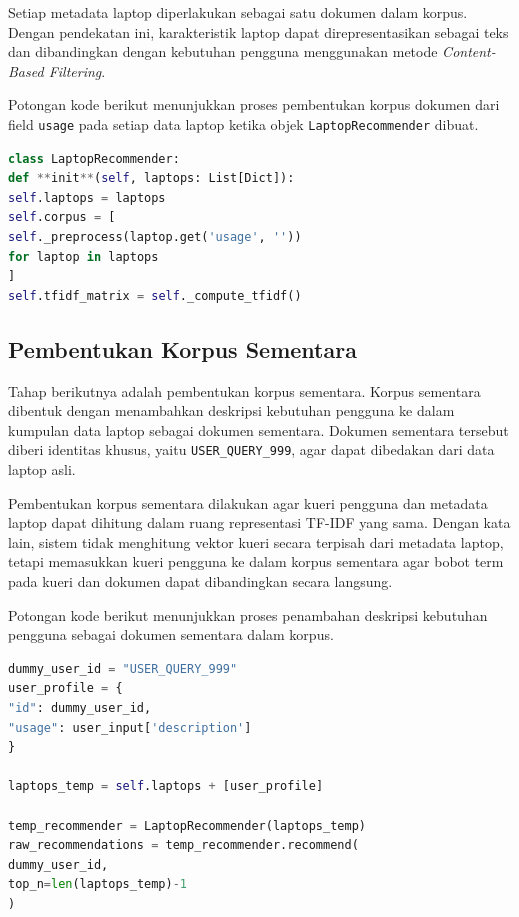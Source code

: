 Setiap metadata laptop diperlakukan sebagai satu dokumen dalam korpus. Dengan pendekatan ini, karakteristik laptop dapat direpresentasikan sebagai teks dan dibandingkan dengan kebutuhan pengguna menggunakan metode \textit{Content-Based Filtering}.

Potongan kode berikut menunjukkan proses pembentukan korpus dokumen dari field \texttt{usage} pada setiap data laptop ketika objek \texttt{LaptopRecommender} dibuat.

\begin{lstlisting}[basicstyle=\linespread{0.8}\ttfamily\footnotesize, language=Python, breaklines=true, caption={Potongan Kode Memuat Metadata Laptop sebagai Korpus}, label=kode:memuat_metadata_laptop]
class LaptopRecommender:
def **init**(self, laptops: List[Dict]):
self.laptops = laptops
self.corpus = [
self._preprocess(laptop.get('usage', ''))
for laptop in laptops
]
self.tfidf_matrix = self._compute_tfidf()
\end{lstlisting}

\subsection{Pembentukan Korpus Sementara}
Tahap berikutnya adalah pembentukan korpus sementara. Korpus sementara dibentuk dengan menambahkan deskripsi kebutuhan pengguna ke dalam kumpulan data laptop sebagai dokumen sementara. Dokumen sementara tersebut diberi identitas khusus, yaitu \texttt{USER\_QUERY\_999}, agar dapat dibedakan dari data laptop asli.

Pembentukan korpus sementara dilakukan agar kueri pengguna dan metadata laptop dapat dihitung dalam ruang representasi TF-IDF yang sama. Dengan kata lain, sistem tidak menghitung vektor kueri secara terpisah dari metadata laptop, tetapi memasukkan kueri pengguna ke dalam korpus sementara agar bobot term pada kueri dan dokumen dapat dibandingkan secara langsung.

Potongan kode berikut menunjukkan proses penambahan deskripsi kebutuhan pengguna sebagai dokumen sementara dalam korpus.

\begin{lstlisting}[basicstyle=\linespread{0.8}\ttfamily\footnotesize, language=Python, breaklines=true, caption={Potongan Kode Pembentukan Korpus Sementara}, label=kode:korpus_sementara]
dummy_user_id = "USER_QUERY_999"
user_profile = {
"id": dummy_user_id,
"usage": user_input['description']
}

laptops_temp = self.laptops + [user_profile]

temp_recommender = LaptopRecommender(laptops_temp)
raw_recommendations = temp_recommender.recommend(
dummy_user_id,
top_n=len(laptops_temp)-1
)
\end{lstlisting}

